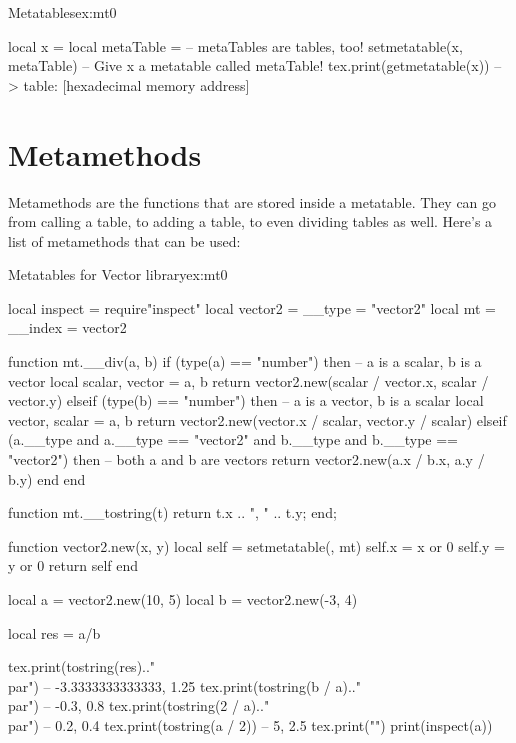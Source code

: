 \begin{texexample}{Metatables}{ex:mt0}
\begin{luacode}
local x = {}
local metaTable = {}       -- metaTables are tables, too!
setmetatable(x, metaTable) -- Give x a metatable called metaTable!
tex.print(getmetatable(x)) --> table: [hexadecimal memory address]
\end{luacode}
\end{texexample}

\section{Metamethods}

Metamethods are the functions that are stored inside a metatable. They can go from
calling a table, to adding a table, to even dividing tables as well. Here’s a list
of metamethods that can be used:



\begin{texexample}{Metatables for Vector library}{ex:mt0}
\begin{luacode}
local inspect = require"inspect"
local vector2 = {__type = "vector2"}
local mt = {__index = vector2}
 
function mt.__div(a, b)
	if (type(a) == "number") then
		-- a is a scalar, b is a vector
		local scalar, vector = a, b
		return vector2.new(scalar / vector.x, scalar / vector.y)
	elseif (type(b) == "number") then
		-- a is a vector, b is a scalar
		local vector, scalar = a, b
		return vector2.new(vector.x / scalar, vector.y / scalar)
	elseif (a.__type and a.__type == "vector2" and b.__type and b.__type == "vector2") then
		-- both a and b are vectors
		return vector2.new(a.x / b.x, a.y / b.y)
	end
end
 
function mt.__tostring(t)
	return t.x .. ", " .. t.y;
end;
 
function vector2.new(x, y)
	local self = setmetatable({}, mt)
	self.x = x or 0
	self.y = y or 0
	return self
end
 
local a = vector2.new(10, 5)
local b = vector2.new(-3, 4)
 
local res = a/b

tex.print(tostring(res).."\\par")   -- -3.3333333333333, 1.25
tex.print(tostring(b / a).."\\par") -- -0.3, 0.8
tex.print(tostring(2 / a).."\\par") -- 0.2, 0.4
tex.print(tostring(a / 2)) -- 5, 2.5
tex.print("")
print(inspect(a))
\end{luacode}
\end{texexample}

